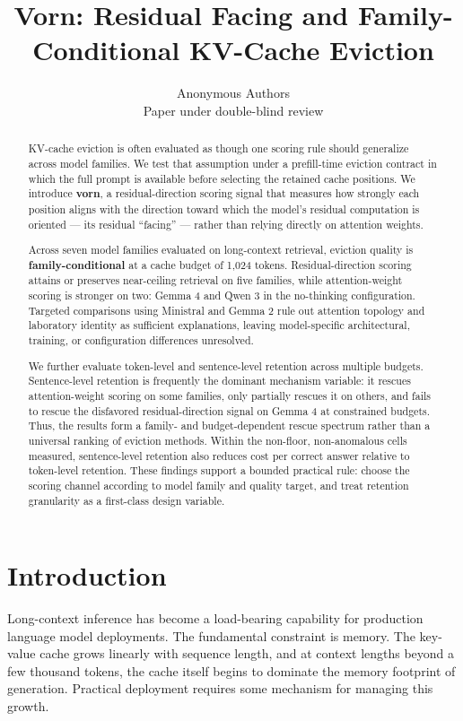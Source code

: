 \documentclass[10pt]{article}
\title{Vorn: Residual Facing and Family-Conditional KV-Cache Eviction}
\author{\name Anonymous Authors \\ \addr Paper under double-blind review}
\date{}
\begin{document}
\sloppy
\maketitle

\begin{abstract}
KV-cache eviction is often evaluated as though one scoring rule should
generalize across model families. We test that assumption under a
prefill-time eviction contract in which the full prompt is available
before selecting the retained cache positions. We introduce
\textbf{vorn}, a residual-direction scoring signal that measures how
strongly each position aligns with the direction toward which the
model's residual computation is oriented --- its residual ``facing'' ---
rather than relying directly on attention weights.

Across seven model families evaluated on long-context retrieval,
eviction quality is \textbf{family-conditional} at a cache budget of
1,024 tokens. Residual-direction scoring attains or preserves
near-ceiling retrieval on five families, while attention-weight scoring
is stronger on two: Gemma 4 and Qwen 3 in the no-thinking
configuration. Targeted comparisons using Ministral and Gemma 2 rule
out attention topology and laboratory identity as sufficient
explanations, leaving model-specific architectural, training, or
configuration differences unresolved.

We further evaluate token-level and sentence-level retention across
multiple budgets. Sentence-level retention is frequently the dominant
mechanism variable: it rescues attention-weight scoring on some
families, only partially rescues it on others, and fails to rescue the
disfavored residual-direction signal on Gemma 4 at constrained budgets.
Thus, the results form a family- and budget-dependent rescue spectrum
rather than a universal ranking of eviction methods. Within the
non-floor, non-anomalous cells measured, sentence-level retention also
reduces cost per correct answer relative to token-level retention.
These findings support a bounded practical rule: choose the scoring
channel according to model family and quality target, and treat
retention granularity as a first-class design variable.
\end{abstract}

\section{Introduction}\label{1-introduction}

Long-context inference has become a load-bearing capability for
production language model deployments. The fundamental constraint is
memory. The key-value cache grows linearly with sequence length, and at
context lengths beyond a few thousand tokens, the cache itself begins to
dominate the memory footprint of generation. Practical deployment
requires some mechanism for managing this growth.
\end{document}
